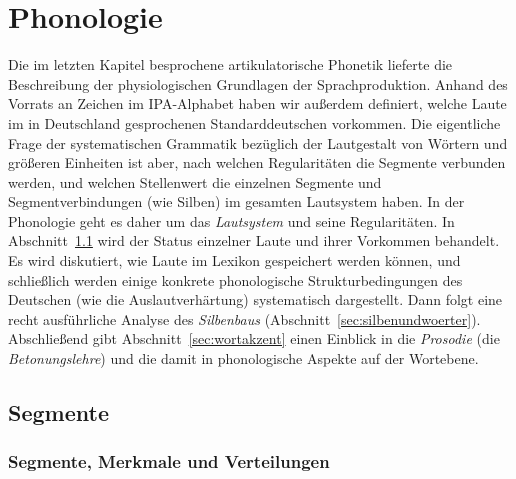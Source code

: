 \chapter{Phonologie}

\label{sec:phonologie}

Die im letzten Kapitel besprochene artikulatorische Phonetik lieferte die Beschreibung der physiologischen Grundlagen der Sprachproduktion.
Anhand des Vorrats an Zeichen im IPA-Alphabet haben wir außerdem definiert, welche Laute im in Deutschland gesprochenen Standarddeutschen vorkommen.
Die eigentliche Frage der systematischen Grammatik bezüglich der Lautgestalt von Wörtern und größeren Einheiten ist aber, nach welchen Regularitäten die Segmente verbunden werden, und welchen Stellenwert die einzelnen Segmente und Segmentverbindungen (wie \zB Silben) im gesamten Lautsystem haben.
In der Phonologie geht es daher um das \textit{Lautsystem} und seine Regularitäten.
In Abschnitt~\ref{sec:segmente} wird der Status einzelner Laute und ihrer Vorkommen behandelt.
Es wird diskutiert, wie Laute im Lexikon gespeichert werden können, und schließlich werden einige konkrete phonologische Strukturbedingungen des Deutschen (wie die Auslautverhärtung) systematisch dargestellt.
Dann folgt eine recht ausführliche Analyse des \textit{Silbenbaus} (Abschnitt~\ref{sec:silbenundwoerter}).
Abschließend gibt Abschnitt~\ref{sec:wortakzent} einen Einblick in die \textit{Prosodie} (die \textit{Betonungslehre}) und die damit in phonologische Aspekte auf der Wortebene.

\section{Segmente}

\label{sec:segmente}

\subsection{Segmente, Merkmale und Verteilungen}

\label{sec:segmentemerkmaleverteilungen}

